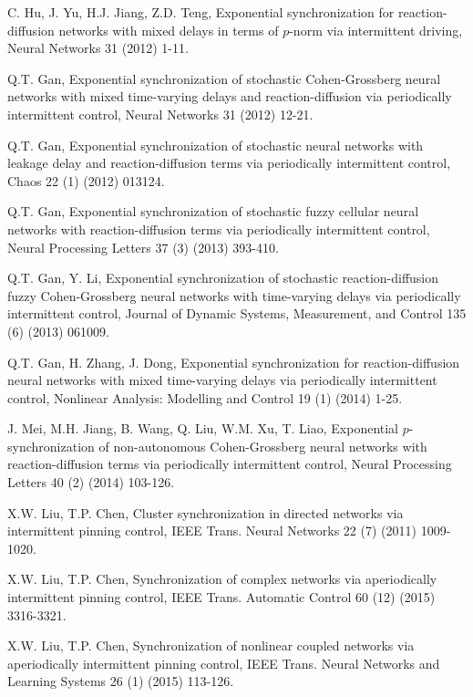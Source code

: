 \documentclass[review]{elsarticle}
\begin{document}
\begin{thebibliography}{99}
C. Hu, J. Yu, H.J. Jiang, Z.D. Teng, Exponential synchronization for reaction-diffusion networks with mixed delays in terms of $p$-norm via intermittent driving, Neural Networks 31 (2012) 1-11.

Q.T. Gan, Exponential synchronization of stochastic Cohen-Grossberg neural networks with mixed time-varying delays and reaction-diffusion via periodically intermittent control, Neural Networks 31 (2012) 12-21.

Q.T. Gan, Exponential synchronization of stochastic neural networks with leakage delay and reaction-diffusion terms via periodically intermittent control, Chaos 22 (1) (2012) 013124.

Q.T. Gan, Exponential synchronization of stochastic fuzzy cellular neural networks with reaction-diffusion terms via periodically intermittent control, Neural Processing Letters 37 (3) (2013) 393-410.

Q.T. Gan, Y. Li, Exponential synchronization of stochastic reaction-diffusion fuzzy Cohen-Grossberg neural networks with time-varying delays via periodically intermittent control, Journal of Dynamic Systems, Measurement, and Control 135 (6) (2013) 061009.

Q.T. Gan, H. Zhang, J. Dong, Exponential synchronization for reaction-diffusion neural networks with mixed time-varying delays via periodically intermittent control, Nonlinear Analysis: Modelling and Control 19 (1) (2014) 1-25.

J. Mei, M.H. Jiang, B. Wang, Q. Liu, W.M. Xu, T. Liao, Exponential $p$-synchronization of non-autonomous Cohen-Grossberg neural networks with reaction-diffusion terms via periodically intermittent control, Neural Processing Letters 40 (2) (2014) 103-126.






X.W. Liu, T.P. Chen, Cluster synchronization in directed networks via intermittent pinning control, IEEE Trans. Neural Networks 22 (7) (2011) 1009-1020.

X.W. Liu, T.P. Chen, Synchronization of complex networks via aperiodically intermittent pinning control, IEEE Trans. Automatic Control 60 (12) (2015) 3316-3321.

X.W. Liu, T.P. Chen, Synchronization of nonlinear coupled networks via aperiodically intermittent pinning control, IEEE Trans. Neural Networks and Learning Systems 26 (1) (2015) 113-126.


\end{thebibliography}
\end{document}
